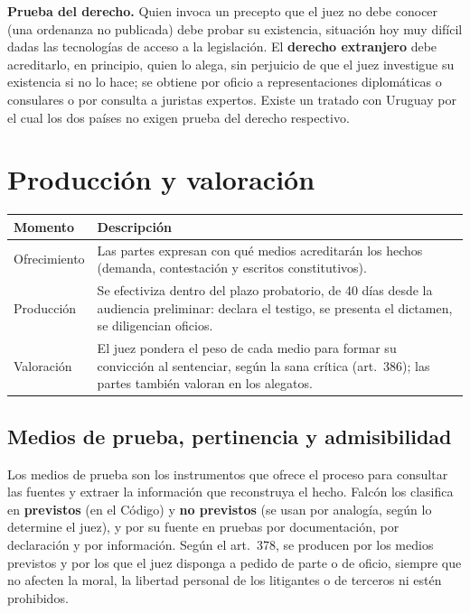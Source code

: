 \documentclass[12pt,oneside]{book}
\renewcommand{\arraystretch}{1.15}
\begin{document}
\textbf{Prueba del derecho.} Quien invoca un precepto que el juez no debe conocer (una ordenanza no publicada) debe probar su existencia, situación hoy muy difícil dadas las tecnologías de acceso a la legislación. El \textbf{derecho extranjero} debe acreditarlo, en principio, quien lo alega, sin perjuicio de que el juez investigue su existencia si no lo hace; se obtiene por oficio a representaciones diplomáticas o consulares o por consulta a juristas expertos. Existe un tratado con Uruguay por el cual los dos países no exigen prueba del derecho respectivo. %

\section{Producción y valoración}

\begin{table}[H]
\centering
\renewcommand{\arraystretch}{1.25}
\begin{tabularx}{\textwidth}{>{\RaggedRight\arraybackslash}p{}>{\RaggedRight\arraybackslash}X}
\toprule
\textbf{Momento} & \textbf{Descripción} \\
\midrule
Ofrecimiento & Las partes expresan con qué medios acreditarán los hechos (demanda, contestación y escritos constitutivos). \\
Producción & Se efectiviza dentro del plazo probatorio, de 40 días desde la audiencia preliminar: declara el testigo, se presenta el dictamen, se diligencian oficios. \\
Valoración & El juez pondera el peso de cada medio para formar su convicción al sentenciar, según la sana crítica (art.~386); las partes también valoran en los alegatos. \\
\bottomrule
\end{tabularx}
\end{table}

\subsection{Medios de prueba, pertinencia y admisibilidad}

Los medios de prueba son los instrumentos que ofrece el proceso para consultar las fuentes y extraer la información que reconstruya el hecho. Falcón los clasifica en \textbf{previstos} (en el Código) y \textbf{no previstos} (se usan por analogía, según lo determine el juez), y por su fuente en pruebas por documentación, por declaración y por información. Según el art.~378, se producen por los medios previstos y por los que el juez disponga a pedido de parte o de oficio, siempre que no afecten la moral, la libertad personal de los litigantes o de terceros ni estén prohibidos.
\end{document}
